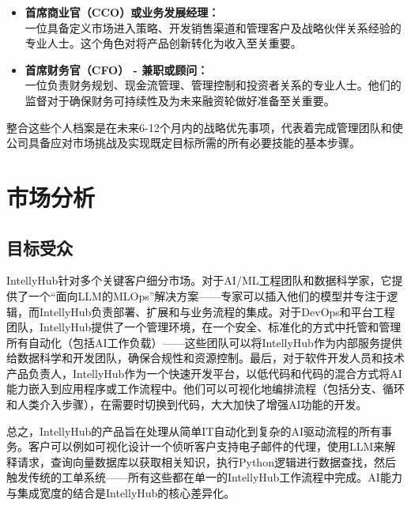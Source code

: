 \documentclass[11pt, a4paper, oneside]{article}
\begin{document}
\begin{itemize}
    \item \textbf{首席商业官（CCO）或业务发展经理：} \\
    一位具备定义市场进入策略、开发销售渠道和管理客户及战略伙伴关系经验的专业人士。这个角色对将产品创新转化为收入至关重要。

    \item \textbf{首席财务官（CFO） - 兼职或顾问：} \\
    一位负责财务规划、现金流管理、管理控制和投资者关系的专业人士。他们的监督对于确保财务可持续性及为未来融资轮做好准备至关重要。
\end{itemize}

整合这些个人档案是在未来6-12个月内的战略优先事项，代表着完成管理团队和使公司具备应对市场挑战及实现既定目标所需的所有必要技能的基本步骤。

\section{市场分析}
\subsection{目标受众}
IntellyHub针对多个关键客户细分市场。对于AI/ML工程团队和数据科学家，它提供了一个“面向LLM的MLOps”解决方案——专家可以插入他们的模型并专注于逻辑，而IntellyHub负责部署、扩展和与业务流程的集成。对于DevOps和平台工程团队，IntellyHub提供了一个管理环境，在一个安全、标准化的方式中托管和管理所有自动化（包括AI工作负载）——这些团队可以将IntellyHub作为内部服务提供给数据科学和开发团队，确保合规性和资源控制。最后，对于软件开发人员和技术产品负责人，IntellyHub作为一个快速开发平台，以低代码和代码的混合方式将AI能力嵌入到应用程序或工作流程中。他们可以可视化地编排流程（包括分支、循环和人类介入步骤），在需要时切换到代码，大大加快了增强AI功能的开发。

总之，IntellyHub的产品旨在处理从简单IT自动化到复杂的AI驱动流程的所有事务。客户可以例如可视化设计一个侦听客户支持电子邮件的代理，使用LLM来解释请求，查询向量数据库以获取相关知识，执行Python逻辑进行数据查找，然后触发传统的工单系统——所有这些都在单一的IntellyHub工作流程中完成。AI能力与集成宽度的结合是IntellyHub的核心差异化。
\end{document}
